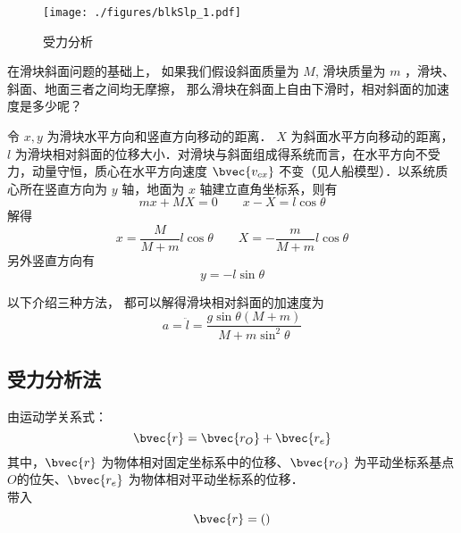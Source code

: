 
\begin{issues}
\issueTODO
\end{issues}


\begin{figure}[ht]
\centering
\texttt{[image: ./figures/blkSlp\_1.pdf]}
\caption{受力分析} \label{blkSlp_fig1}
\end{figure}

在滑块斜面问题的基础上， 如果我们假设斜面质量为 $M$, 滑块质量为 $m$ ，滑块、斜面、地面三者之间均无摩擦， 那么滑块在斜面上自由下滑时，相对斜面的加速度是多少呢？

令 $x, y$ 为滑块水平方向和竖直方向移动的距离． $X$ 为斜面水平方向移动的距离， $l$ 为滑块相对斜面的位移大小．对滑块与斜面组成得系统而言，在水平方向不受力，动量守恒，质心在水平方向速度 $\bvec{v_{cx}}$ 不变（见人船模型）．以系统质心所在竖直方向为 $y$ 轴，地面为 $x$ 轴建立直角坐标系，则有
\begin{equation}
mx+MX=0 \qquad x-X=l\cos\theta
\end{equation}
解得
\begin{equation}\label{blkSlp_eq2}
x = \frac{M}{M + m}l\cos\theta \qquad X = -\frac{m}{M + m}l\cos\theta
\end{equation}
另外竖直方向有
\begin{equation}
y = -l\sin\theta
\end{equation}

以下介绍三种方法， 都可以解得滑块相对斜面的加速度为
\begin{equation}\label{blkSlp_eq1}
a = \ddot l = \frac{g\sin\theta(M+m)}{M + m\sin^2\theta}
\end{equation}

\subsection{受力分析法}

由运动学关系式：
\begin{equation}
\bvec{r}=\bvec{r_{O}}+\bvec{r_{e}}
\end{equation}
其中，$\bvec{r}$ 为物体相对固定坐标系中的位移、$\bvec{r_{O}}$ 为平动坐标系基点$O$的位矢、$\bvec{r_{e}}$ 为物体相对平动坐标系的位移．\\
带入
\begin{equation}
\bvec{r}=()
\end{equation}

